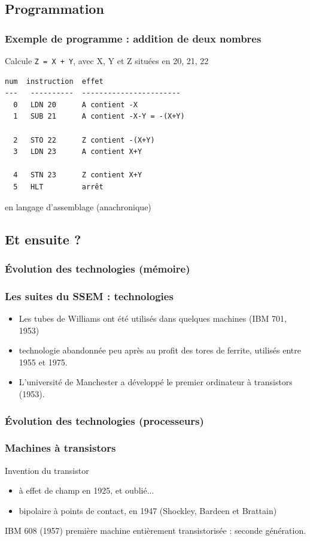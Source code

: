 \documentclass{beamer}
\begin{document}
\subsection{Programmation}
\begin{frame}[containsverbatim]
\frametitle{Exemple de programme : addition de deux nombres }
Calcule \texttt{Z = X + Y},
avec X, Y et Z situées en 20, 21, 22

\begin{verbatim}
num  instruction  effet
---   ----------  -----------------------
  0   LDN 20      A contient -X
  1   SUB 21      A contient -X-Y = -(X+Y) 

  2   STO 22      Z contient -(X+Y)
  3   LDN 23      A contient X+Y

  4   STN 23      Z contient X+Y
  5   HLT         arrêt
\end{verbatim}

en \alert{langage d'assemblage} (anachronique)

\end{frame}

\subsection{Et ensuite ?}
\subsubsection{Évolution des technologies (mémoire)}
\begin{frame}
\frametitle{Les suites du SSEM : technologies}

\begin{itemize}
\item Les tubes de Williams ont été utilisés dans quelques machines
(IBM 701, 1953)
\item technologie abandonnée peu après au profit des \alert{tores de ferrite},
utilisés entre 1955 et 1975.
\item L'université de Manchester a développé le \alert{premier ordinateur à
  transistors} (1953). 
\end{itemize}
\end{frame}

\subsubsection{Évolution des technologies (processeurs)}

\begin{frame}
\frametitle{Machines à transistors}

Invention du transistor
\begin{itemize}
\item à effet de champ  en 1925, et oublié...
\item bipolaire à points de contact, en 1947 (Shockley, Bardeen et Brattain)
\end{itemize}

IBM 608 (1957) première machine entièrement
  transistorisée : seconde génération.

\end{frame}
\end{document}
